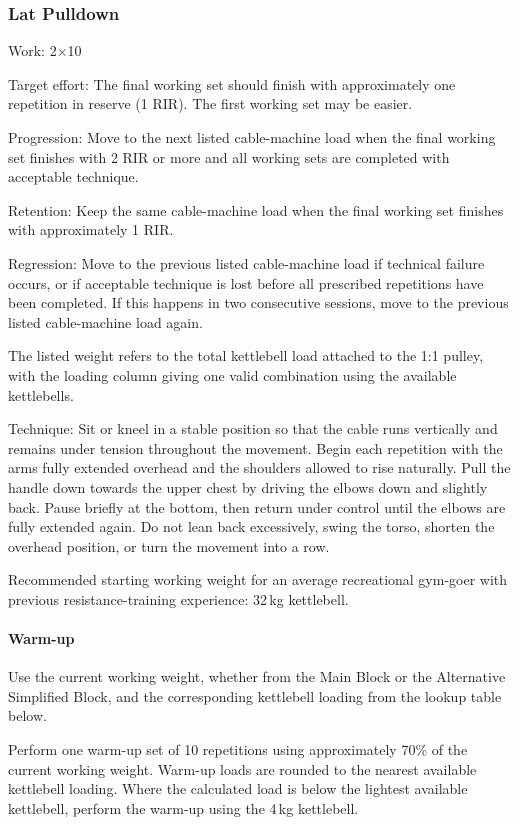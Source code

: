 \documentclass[11pt,a4paper]{article}
\begin{document}
\newpage
\subsubsection{Lat Pulldown}

Work: 2$\times$10

Target effort: The final working set should finish with approximately one repetition in reserve (1 RIR). The first working set may be easier.

Progression: Move to the next listed cable-machine load when the final working set finishes with 2 RIR or more and all working sets are completed with acceptable technique.

Retention: Keep the same cable-machine load when the final working set finishes with approximately 1 RIR.

Regression: Move to the previous listed cable-machine load if technical failure occurs, or if acceptable technique is lost before all prescribed repetitions have been completed. If this happens in two consecutive sessions, move to the previous listed cable-machine load again.

The listed weight refers to the total kettlebell load attached to the 1:1 pulley, with the loading column giving one valid combination using the available kettlebells.

Technique: Sit or kneel in a stable position so that the cable runs vertically and remains under tension throughout the movement. Begin each repetition with the arms fully extended overhead and the shoulders allowed to rise naturally. Pull the handle down towards the upper chest by driving the elbows down and slightly back. Pause briefly at the bottom, then return under control until the elbows are fully extended again. Do not lean back excessively, swing the torso, shorten the overhead position, or turn the movement into a row.

Recommended starting working weight for an average recreational gym-goer with previous resistance-training experience: 32\,kg kettlebell.

\paragraph{Warm-up}

Use the current working weight, whether from the Main Block or the Alternative Simplified Block, and the corresponding kettlebell loading from the lookup table below.

Perform one warm-up set of 10 repetitions using approximately 70\% of the current working weight. Warm-up loads are rounded to the nearest available kettlebell loading. Where the calculated load is below the lightest available kettlebell, perform the warm-up using the 4\,kg kettlebell.
\end{document}
